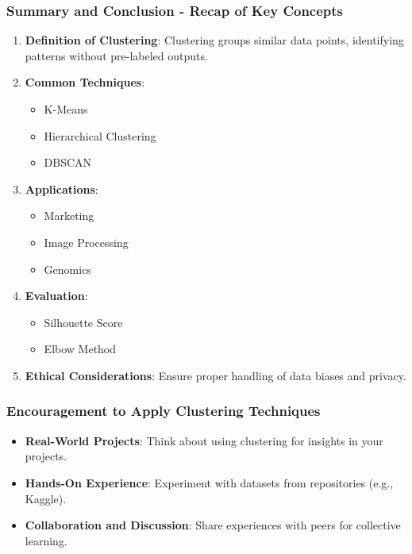 \documentclass[aspectratio=169]{beamer}
\begin{document}
\begin{frame}[fragile]
    \frametitle{Summary and Conclusion - Recap of Key Concepts}
    
    \begin{enumerate}
        \item \textbf{Definition of Clustering}: 
        Clustering groups similar data points, identifying patterns without pre-labeled outputs.
        
        \item \textbf{Common Techniques}:
        \begin{itemize}
            \item K-Means
            \item Hierarchical Clustering
            \item DBSCAN
        \end{itemize}
        
        \item \textbf{Applications}:
        \begin{itemize}
            \item Marketing
            \item Image Processing
            \item Genomics
        \end{itemize}
        
        \item \textbf{Evaluation}:
        \begin{itemize}
            \item Silhouette Score
            \item Elbow Method
        \end{itemize}
        
        \item \textbf{Ethical Considerations}:
        Ensure proper handling of data biases and privacy.
    \end{enumerate}
\end{frame}

\begin{frame}[fragile]
    \frametitle{Encouragement to Apply Clustering Techniques}
    
    \begin{itemize}
        \item \textbf{Real-World Projects}:
        Think about using clustering for insights in your projects.
        
        \item \textbf{Hands-On Experience}:
        Experiment with datasets from repositories (e.g., Kaggle).
        
        \item \textbf{Collaboration and Discussion}:
        Share experiences with peers for collective learning.
    \end{itemize}
\end{frame}
\end{document}
